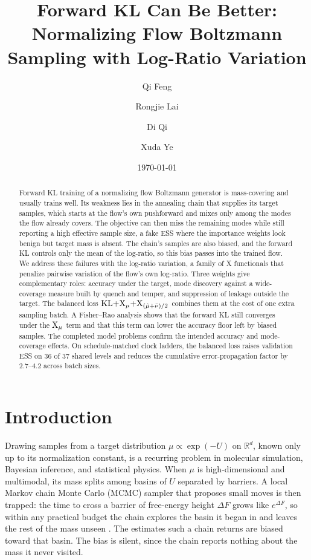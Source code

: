 \documentclass{article}
\title{Forward KL Can Be Better: Normalizing Flow Boltzmann Sampling with Log-Ratio Variation}
\author[1]{Qi Feng}
\author[2]{Rongjie Lai}
\author[2]{Di Qi}
\author[2]{Xuda Ye}
\affil[1]{Department of Mathematics, Florida State University, Tallahassee, FL 32306}
\affil[2]{Department of Mathematics, Purdue University, West Lafayette, IN 47907}
\date{\today}
\begin{document}
\maketitle

\newcommand{\pendingfigure}{%
\fbox{\parbox[c][0.16\textheight][c]{0.82\linewidth}{%
\centering\texttt{[pending to run]}}}}

\begin{abstract}
Forward KL training of a normalizing flow Boltzmann generator is mass-covering and usually trains well. Its weakness lies in the annealing chain that supplies its target samples, which starts at the flow's own pushforward and mixes only among the modes the flow already covers. The objective can then miss the remaining modes while still reporting a high effective sample size, a fake ESS where the importance weights look benign but target mass is absent. The chain's samples are also biased, and the forward KL controls only the mean of the log-ratio, so this bias passes into the trained flow. We address these failures with the log-ratio variation, a family of X functionals that penalize pairwise variation of the flow's own log-ratio. Three weights give complementary roles: accuracy under the target, mode discovery against a wide-coverage measure built by quench and temper, and suppression of leakage outside the target. The balanced loss $\mathrm{KL}{+}\mathrm{X}_\mu{+}\mathrm{X}_{(\hat\mu+\bar\nu)/2}$ combines them at the cost of one extra sampling batch. A Fisher--Rao analysis shows that the forward KL still converges under the $\mathrm{X}_\mu$ term and that this term can lower the accuracy floor left by biased samples. The completed model problems confirm the intended accuracy and mode-coverage effects. On schedule-matched clock ladders, the balanced loss raises validation ESS on $36$ of $37$ shared levels and reduces the cumulative error-propagation factor by $2.7$--$4.2$ across batch sizes.
\end{abstract}

\section{Introduction}
\label{sec: intro}

Drawing samples from a target distribution $\mu \propto \exp(-U)$ on $\mathbb R^d$, known only up to its normalization constant, is a recurring problem in molecular simulation, Bayesian inference, and statistical physics. When $\mu$ is high-dimensional and multimodal, its mass splits among basins of $U$ separated by barriers. A local Markov chain Monte Carlo (MCMC) sampler that proposes small moves is then trapped: the time to cross a barrier of free-energy height $\Delta F$ grows like $e^{\Delta F}$, so within any practical budget the chain explores the basin it began in and leaves the rest of the mass unseen \citep{metropolis1953equation,hastings1970monte}. The estimates such a chain returns are biased toward that basin. The bias is silent, since the chain reports nothing about the mass it never visited.
\end{document}
